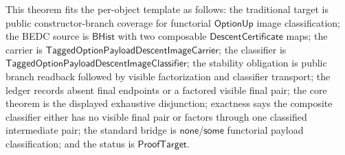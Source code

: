 \begin{theorem}
\label{thm:tagged-option-composite-image-classifier-public-branch-classification}
This theorem fits the per-object template as follows: the traditional target is
public constructor-branch coverage for functorial $\mathsf{OptionUp}$ image
classification; the BEDC source is $\mathsf{BHist}$ with two composable
$\mathsf{DescentCertificate}$ maps; the carrier is
$\mathsf{TaggedOptionPayloadDescentImageCarrier}$; the classifier is
$\mathsf{TaggedOptionPayloadDescentImageClassifier}$; the stability obligation
is public branch readback followed by visible factorization and classifier
transport; the ledger records absent final endpoints or a factored visible final
pair; the core theorem is the displayed exhaustive disjunction; exactness says
the composite classifier either has no visible final pair or factors through one
classified intermediate pair; the standard bridge is $\mathsf{none}$/$\mathsf{some}$
functorial payload classification; and the status is $\mathsf{ProofTarget}$.


\end{theorem}
